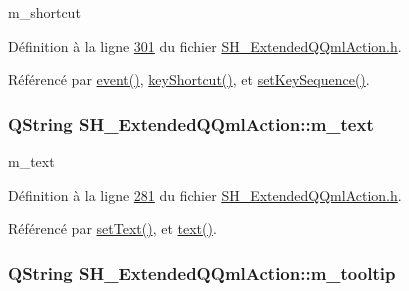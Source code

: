m\-\_\-shortcut 



Définition à la ligne \hyperlink{SH__ExtendedQQmlAction_8h_source_l00301}{301} du fichier \hyperlink{SH__ExtendedQQmlAction_8h_source}{S\-H\-\_\-\-Extended\-Q\-Qml\-Action.\-h}.



Référencé par \hyperlink{classSH__ExtendedQQmlAction_a2067689e7c1e14a316ad6095e57d6cf6}{event()}, \hyperlink{classSH__ExtendedQQmlAction_a2efb60c1b33a04e8e58ef9184dccbd2d}{key\-Shortcut()}, et \hyperlink{classSH__ExtendedQQmlAction_a33a3ff960a56b08d97afd9ed5351cf68}{set\-Key\-Sequence()}.

\hypertarget{classSH__ExtendedQQmlAction_a8fd83c5e68691a582fa7e0c62d661c71}{
\subsubsection[{m\-\_\-text}]{\setlength{\rightskip}{0pt plus 5cm}Q\-String S\-H\-\_\-\-Extended\-Q\-Qml\-Action\-::m\-\_\-text\hspace{0.3cm}{\ttfamily [private]}}}\label{classSH__ExtendedQQmlAction_a8fd83c5e68691a582fa7e0c62d661c71}


m\-\_\-text 



Définition à la ligne \hyperlink{SH__ExtendedQQmlAction_8h_source_l00281}{281} du fichier \hyperlink{SH__ExtendedQQmlAction_8h_source}{S\-H\-\_\-\-Extended\-Q\-Qml\-Action.\-h}.



Référencé par \hyperlink{classSH__ExtendedQQmlAction_af0b32d40b7195ad38b0348cec6dd7c70}{set\-Text()}, et \hyperlink{classSH__ExtendedQQmlAction_a827915b0ce23a1af60d9aaaf7d052447}{text()}.

\hypertarget{classSH__ExtendedQQmlAction_af04bb6a8446dcd4701a98fc667be693f}{
\subsubsection[{m\-\_\-tooltip}]{\setlength{\rightskip}{0pt plus 5cm}Q\-String S\-H\-\_\-\-Extended\-Q\-Qml\-Action\-::m\-\_\-tooltip\hspace{0.3cm}{\ttfamily [private]}}}\label{classSH__ExtendedQQmlAction_af04bb6a8446dcd4701a98fc667be693f}


